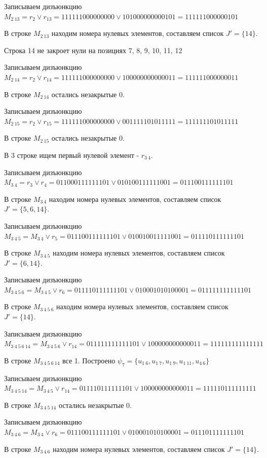 \documentclass{article}
\begin{document}
Записываем дизъюнкцию $M_{2\ 13} = r_{2}\lor r_{13} = 111111000000000 \lor 101000000000101 = 111111000000101$

В строке $M_{2\ 13}$ находим номера нулевых элементов, составляем список $J' = \{14\}$.

Строка 14 не закроет нули на позициях 7, 8, 9, 10, 11, 12

Записываем дизъюнкцию $M_{2\ 14} = r_{2}\lor r_{14} = 111111000000000 \lor 100000000000011 = 111111000000011$

В строке $M_{2\ 14}$ остались незакрытые 0.

Записываем дизъюнкцию $M_{2\ 15} = r_{2}\lor r_{15} = 111111000000000 \lor 001111101011111 = 111111101011111$

В строке $M_{2\ 15}$ остались незакрытые 0.



В 3 строке ищем первый нулевой элемент - $r_{3\ 4}$.

Записываем дизъюнкцию $M_{3\ 4} = r_{3}\lor r_{4} = 011000111111101 \lor 010100111111001 = 011100111111101$

В строке $M_{3\ 4}$ находим номера нулевых элементов, составляем список $J' = \{5, 6, 14\}$.

Записываем дизъюнкцию $M_{3\ 4\ 5} = M_{3\ 4}\lor r_{5} = 011100111111101 \lor 010010011111001 = 011110111111101$

В строке $M_{3\ 4\ 5}$ находим номера нулевых элементов, составляем список $J' = \{6, 14\}$.

Записываем дизъюнкцию $M_{3\ 4\ 5\ 6} = M_{3\ 4\ 5}\lor r_{6} = 011110111111101 \lor 010001010100001 = 011111111111101$

В строке $M_{3\ 4\ 5\ 6}$ находим номера нулевых элементов, составляем список $J' = \{14\}$.

Записываем дизъюнкцию $M_{3\ 4\ 5\ 6\ 14} = M_{3\ 4\ 5\ 6}\lor r_{14} = 011111111111101 \lor 100000000000011 = 111111111111111$

В строке $M_{3\ 4\ 5\ 6\ 14}$ все 1. Построено $\psi_{7} = \{u_{1\ 6},u_{1\ 7},u_{1\ 9},u_{1\ 11},u_{4\ 6}\}$

Записываем дизъюнкцию $M_{3\ 4\ 5\ 14} = M_{3\ 4\ 5}\lor r_{14} = 011110111111101 \lor 100000000000011 = 111110111111111$

В строке $M_{3\ 4\ 5\ 14}$ остались незакрытые 0.

Записываем дизъюнкцию $M_{3\ 4\ 6} = M_{3\ 4}\lor r_{6} = 011100111111101 \lor 010001010100001 = 011101111111101$

В строке $M_{3\ 4\ 6}$ находим номера нулевых элементов, составляем список $J' = \{14\}$.
\end{document}
